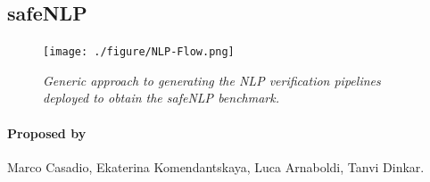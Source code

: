 \documentclass[oneside,11pt,dvipsnames]{book}
\begin{document}


\subsection{safeNLP}

\begin{figure}[htbp]
    \centering
    \texttt{[image: ./figure/NLP-Flow.png]}
    \caption{\small\emph{Generic approach to generating the NLP verification pipelines~\cite{casadio2023antonio,casadio2024nlp} deployed to obtain the safeNLP benchmark.}}
   \label{fig:antonio}
\end{figure}

\paragraph*{Proposed by} Marco Casadio, Ekaterina Komendantskaya, Luca Arnaboldi, Tanvi Dinkar.
\end{document}
